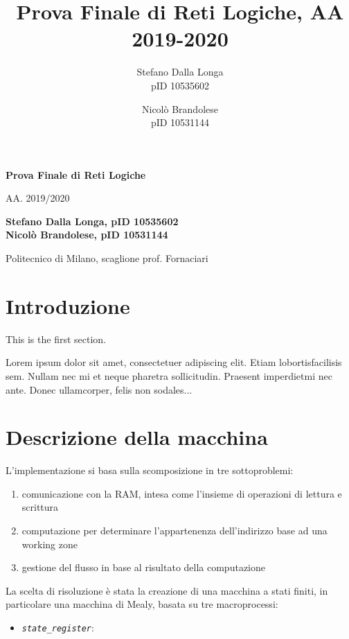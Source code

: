 \documentclass[a4paper,titlepage]{article}
\author{Stefano Dalla Longa\\pID 10535602 \and Nicolò Brandolese\\pID 10531144}
\date{}
\title{Prova Finale di Reti Logiche, AA 2019-2020}
\begin{document}
	\begin{titlepage}
    \begin{center}
        \vspace*{3cm}
            
        \Huge
        \textbf{Prova Finale di Reti Logiche}
            
        \vspace{0.5cm}
        \LARGE
        AA. 2019/2020
            
        \vspace{1.5cm}
            
        \textbf{Stefano Dalla Longa, pID 10535602 \\ Nicolò Brandolese, pID 10531144}
        
        \vspace{1.2 cm}
        \Large
		Politecnico di Milano, scaglione prof. Fornaciari
            
        \vspace{0.8cm}
            
    \end{center}
\end{titlepage}

	\tableofcontents
	\clearpage	%
	\section{Introduzione}
   
		This is the first section.
      
		Lorem  ipsum  dolor  sit  amet,  consectetuer  adipiscing  
		elit.   Etiam  lobortisfacilisis sem.  Nullam nec mi et 
		neque pharetra sollicitudin.  Praesent imperdietmi nec ante. 
		Donec ullamcorper, felis non sodales...
       
	\section{Descrizione della macchina}
		L'implementazione si basa sulla scomposizione in tre sottoproblemi:
		\begin{enumerate}
			\item comunicazione con la RAM, intesa come l'insieme di operazioni di lettura e scrittura
			\item computazione per determinare l'appartenenza dell'indirizzo base ad una working zone
			\item gestione del flusso in base al risultato della computazione
		\end{enumerate}
		La scelta di risoluzione è stata la creazione di una macchina a stati finiti, in particolare una macchina di Mealy, basata su tre macroprocessi:
		\begin{itemize}
			\item \textit{\texttt{state\_register}}:
		\end{itemize}
\end{document}
